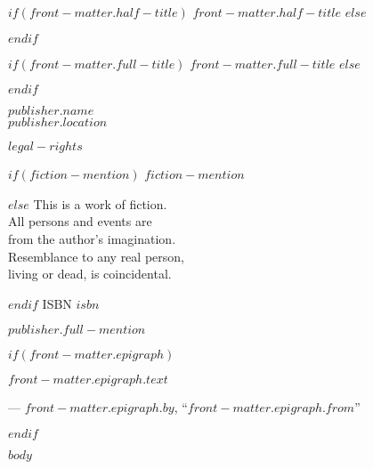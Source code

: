 \documentclass[v2,$lang$]{novel} %
\begin{document}
\frontmatter

\thispagestyle{empty}
$if(front-matter.half-title)$
$front-matter.half-title$
$else$
\vspace*{6\nbs}
\hfill\charscale[2.4]{\textbf{\theTitle}}\par
$endif$
\clearpage

\thispagestyle{empty}
\null
\clearpage

\thispagestyle{empty}
\vspace*{5\nbs}
\begin{center}
$if(front-matter.full-title)$
$front-matter.full-title$
$else$
\charscale[3.6]{\textbf{\theTitle}}\par
$endif$
\vspace{1.5\nbs}
\charscale[1.6]{\theSubtitle}\par
\vspace{4\nbs}
\vspace{4\nbs}
{\theAuthor}
\vfill
{ $publisher.name$\\
$publisher.location$}\par

\end{center}
\clearpage


\thispagestyle{empty}
\begin{center}
\itshape{
\null
\vfill
\textsc{\theTitle}\par
\par

$legal-rights$\par
\null
$if(fiction-mention)$
$fiction-mention$\par
$else$
This is a work of fiction.\\
All persons and events are\\
from the author's imagination.\\
Resemblance to any real person,\\
living or dead, is coincidental.\par
$endif$
\null
ISBN $isbn$\par %
\null

$publisher.full-mention$
} %
\end{center}
\clearpage


$if(front-matter.epigraph)$
\thispagestyle{empty}
\vspace*{7\nbs}
\begin{adjustwidth}{4em}{4em}
{\itshape \noindent $front-matter.epigraph.text$\par}
\hfill--- $front-matter.epigraph.by$, ``$front-matter.epigraph.from$''\par
\end{adjustwidth}
$endif$

\cleartorecto %

\mainmatter

$body$
\end{document}
